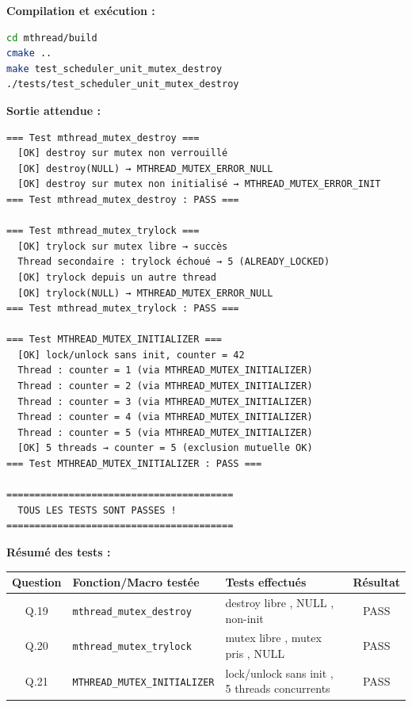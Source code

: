 \documentclass[11pt,a4paper]{article}
\newcommand{\cmark}{\ding{51}}
\let\oldtexttt\texttt
\renewcommand{\texttt}[1]{\oldtexttt{\color{keyword}#1}}
\begin{document}
\textbf{Compilation et exécution :}
\begin{lstlisting}[language=bash]
cd mthread/build
cmake ..
make test_scheduler_unit_mutex_destroy
./tests/test_scheduler_unit_mutex_destroy
\end{lstlisting}

\textbf{Sortie attendue :}
\begin{lstlisting}[language=text]
=== Test mthread_mutex_destroy ===
  [OK] destroy sur mutex non verrouillé
  [OK] destroy(NULL) → MTHREAD_MUTEX_ERROR_NULL
  [OK] destroy sur mutex non initialisé → MTHREAD_MUTEX_ERROR_INIT
=== Test mthread_mutex_destroy : PASS ===

=== Test mthread_mutex_trylock ===
  [OK] trylock sur mutex libre → succès
  Thread secondaire : trylock échoué → 5 (ALREADY_LOCKED)
  [OK] trylock depuis un autre thread
  [OK] trylock(NULL) → MTHREAD_MUTEX_ERROR_NULL
=== Test mthread_mutex_trylock : PASS ===

=== Test MTHREAD_MUTEX_INITIALIZER ===
  [OK] lock/unlock sans init, counter = 42
  Thread : counter = 1 (via MTHREAD_MUTEX_INITIALIZER)
  Thread : counter = 2 (via MTHREAD_MUTEX_INITIALIZER)
  Thread : counter = 3 (via MTHREAD_MUTEX_INITIALIZER)
  Thread : counter = 4 (via MTHREAD_MUTEX_INITIALIZER)
  Thread : counter = 5 (via MTHREAD_MUTEX_INITIALIZER)
  [OK] 5 threads → counter = 5 (exclusion mutuelle OK)
=== Test MTHREAD_MUTEX_INITIALIZER : PASS ===

========================================
  TOUS LES TESTS SONT PASSES !
========================================
\end{lstlisting}

\textbf{Résumé des tests :}
\begin{center}
\begin{tabular}{|c|l|l|c|}
\hline
\textbf{Question} & \textbf{Fonction/Macro testée} & \textbf{Tests effectués} & \textbf{Résultat} \\
\hline
Q.19 & \texttt{mthread\_mutex\_destroy} & destroy libre \cmark, NULL \cmark, non-init \cmark & PASS \\
\hline
Q.20 & \texttt{mthread\_mutex\_trylock} & mutex libre \cmark, mutex pris \cmark, NULL \cmark & PASS \\
\hline
Q.21 & \texttt{MTHREAD\_MUTEX\_INITIALIZER} & lock/unlock sans init \cmark, 5 threads concurrents \cmark & PASS \\
\hline
\end{tabular}
\end{center}
\end{document}
